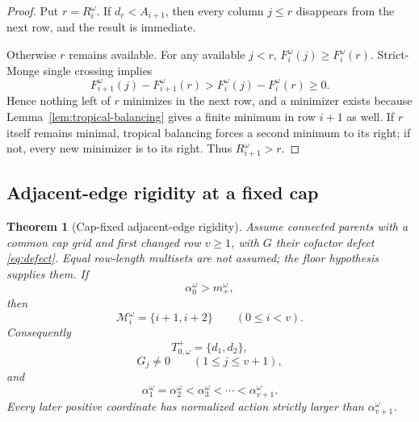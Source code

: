 \documentclass[11pt,a4paper]{amsart}
\numberwithin{equation}{section}
\theoremstyle{plain}
\newtheorem{theorem}{Theorem}[section]
\theoremstyle{definition}
\begin{document}
\begin{proof}
Put \(r=R_i^\omega\).  If \(d_r<A_{i+1}\), then every column \(j\le r\) disappears from the next row, and the result is immediate.

Otherwise \(r\) remains available.  For any available \(j<r\), \(F_i^\omega(j)\ge F_i^\omega(r)\).
Strict-Monge single crossing implies
\[
F_{i+1}^\omega(j)-F_{i+1}^\omega(r)
>
F_i^\omega(j)-F_i^\omega(r)
\ge0.
\]
Hence nothing left of \(r\) minimizes in the next row, and a minimizer exists because Lemma~\ref{lem:tropical-balancing} gives a finite minimum in row \(i+1\) as well.  If \(r\) itself remains minimal, tropical balancing forces a second minimum to its right; if not, every new minimizer is to its right.  Thus \(R_{i+1}^\omega>r\).
\end{proof}

\subsection{Adjacent-edge rigidity at a fixed cap}

\begin{theorem}[Cap-fixed adjacent-edge rigidity]\label{thm:cap-fixed-rigidity}
Assume connected parents with a common cap grid and first changed row \(v\ge1\), with \(G\) their cofactor defect \eqref{eq:defect}.  Equal row-length multisets are \emph{not} assumed; the floor hypothesis supplies them.  If
\begin{equation}\label{eq:floor-antecedent-general}
\alpha_0^\omega>m_+^\omega,
\end{equation}
then
\begin{equation}\label{eq:adjacent-chain-capfixed}
\mathcal M_i^\omega=\{i+1,i+2\}
\qquad(0\le i<v).
\end{equation}
Consequently
\begin{equation}\label{eq:floor-set-general}
T_{0,\omega}^+=\{d_1,d_2\},
\end{equation}
\begin{equation}\label{eq:support-prefix}
G_j\ne0\qquad(1\le j\le v+1),
\end{equation}
and
\begin{equation}\label{eq:prefix-profile}
\alpha_1^\omega=\alpha_2^\omega<\alpha_3^\omega<\cdots<\alpha_{v+1}^\omega.
\end{equation}
Every later positive coordinate has normalized action strictly larger than \(\alpha_{v+1}^\omega\).
\end{theorem}
\end{document}
